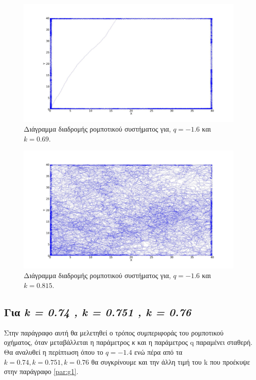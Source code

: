 \begin{figure}[ht]
	\centering
	\includegraphics[width=1\linewidth]{LateX images/log/k/g2-1.6}
	\caption{Διάγραμμα διαδρομής ρομποτικού συστήματος για, $q = -1.6$ και $k = 0.69$.}
	\label{f:g79}	
\end{figure}

\begin{figure}[ht]
	\centering
	\includegraphics[width=1\linewidth]{LateX images/log/k/g3-1.6}
	\caption{Διάγραμμα διαδρομής ρομποτικού συστήματος για, $q = -1.6$ και $k = 0.815$.}
	\label{f:g80}	
\end{figure}


\clearpage

\subsection{Για \emph{k = 0.74 , k = 0.751 , k = 0.76}}
\label{par:g3}
Στην παράγραφο αυτή θα μελετηθεί ο τρόπος συμπεριφοράς του ρομποτικού οχήματος, όταν μεταβάλλεται η παράμετρος \emph{κ} και η παράμετρος q παραμένει σταθερή. Θα αναλυθεί η περίπτωση όπου το $ q =-1.4$ ενώ πέρα από τα $k = 0.74 , k = 0.751 , k = 0.76$ θα συγκρίνουμε και την άλλη τιμή του k που προέκυψε στην παράγραφο \ref{par:g1}.

